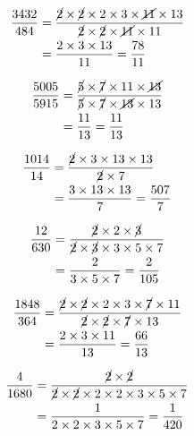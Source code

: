 {{\item\begin{align*}
    \frac{3432}{484} &=
    \frac{\cancel{2} \times \cancel{2} \times 2 \times 3 \times \cancel{11} \times 13}
    {\cancel{2} \times \cancel{2} \times \cancel{11} \times 11}\\ &=
    \frac{2 \times 3 \times 13}
    {11} =
    \frac{78}{11}
    \end{align*}

\item\begin{align*}
    \frac{5005}{5915} &=
    \frac{\cancel{5} \times \cancel{7} \times 11 \times \cancel{13}}
    {\cancel{5} \times \cancel{7} \times \cancel{13} \times 13}\\ &=
    \frac{11}
    {13} =
    \frac{11}{13}
    \end{align*}

\item\begin{align*}
    \frac{1014}{14} &=
    \frac{\cancel{2} \times 3 \times 13 \times 13}
    {\cancel{2} \times 7}\\ &=
    \frac{3 \times 13 \times 13}
    {7} =
    \frac{507}{7}
    \end{align*}

\item\begin{align*}
    \frac{12}{630} &=
    \frac{\cancel{2} \times 2 \times \cancel{3}}
    {\cancel{2} \times \cancel{3} \times 3 \times 5 \times 7}\\ &=
    \frac{2}
    {3 \times 5 \times 7} =
    \frac{2}{105}
    \end{align*}

\item\begin{align*}
    \frac{1848}{364} &=
    \frac{\cancel{2} \times \cancel{2} \times 2 \times 3 \times \cancel{7} \times 11}
    {\cancel{2} \times \cancel{2} \times \cancel{7} \times 13}\\ &=
    \frac{2 \times 3 \times 11}
    {13} =
    \frac{66}{13}
    \end{align*}

\item\begin{align*}
    \frac{4}{1680} &=
    \frac{\cancel{2} \times \cancel{2}}
    {\cancel{2} \times \cancel{2} \times 2 \times 2 \times 3 \times 5 \times 7}\\ &=
    \frac{1}
    {2 \times 2 \times 3 \times 5 \times 7} =
    \frac{1}{420}
    \end{align*}

}}
